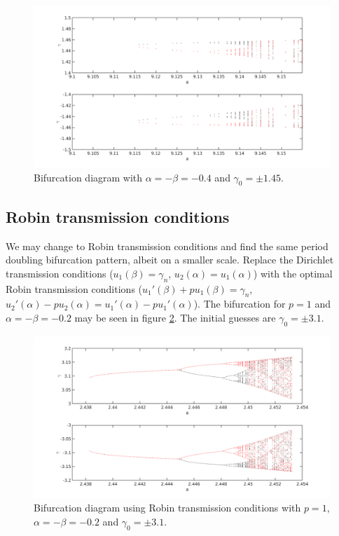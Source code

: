 \documentclass{article}
\begin{document}
\begin{figure}
\includegraphics[width=\textwidth]{bifurcation_overlap2.png}
\caption{Bifurcation diagram with $\alpha = -\beta = -0.4$ and $\gamma_0 = \pm 1.45$.}
\label{fig:overlap2}
\end{figure}

\subsection{Robin transmission conditions}

We may change to Robin transmission conditions and find the same period doubling bifurcation pattern, albeit on a smaller scale.
Replace the Dirichlet transmission conditions ($u_1(\beta) = \gamma_n$, $u_2(\alpha) = u_1(\alpha)$) with the optimal Robin transmission conditions ($u_1'(\beta) + p u_1(\beta) = \gamma_n$, $u_2'(\alpha) - p u_2(\alpha) = u_1'(\alpha) - p u_1'(\alpha)$).
The bifurcation for $p=1$ and $\alpha = -\beta = -0.2$ may be seen in figure \ref{fig:Robin}.
The initial guesses are $\gamma_0 = \pm 3.1$.

\begin{figure}
\includegraphics[width=\textwidth]{bifurcation_Robin.png}
\caption{Bifurcation diagram using Robin transmission conditions with $p=1$, $\alpha = -\beta = -0.2$ and $\gamma_0 = \pm 3.1$.}
\label{fig:Robin}
\end{figure}
\end{document}
